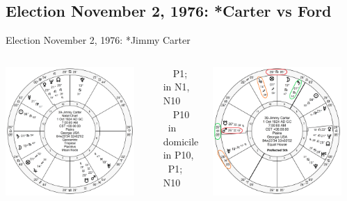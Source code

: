 \subsection{Election November 2, 1976: *Carter vs Ford}
\begin{frame}[t]{Election November 2, 1976: *Jimmy Carter}
\small

\begin{columns}[T, onlytextwidth]
\vspace{-1em}
{\includegraphics[width=0.9\textwidth]{charts/Carter.png}}

\Saturn\, \Trine\, P1; in N1, \Sextile\, N10 \\
\Mars\, \Sextile\, P10 \\
\Jupiter\, in domicile in P10, \Square\, P1; \Trine\, N10

\vspace{-1em}
{\includegraphics[width=0.9\textwidth]{charts/Carter-Prof-5th.png}}
\fontsize{8pt}{9pt}\selectfont


\end{columns}
\end{frame}
